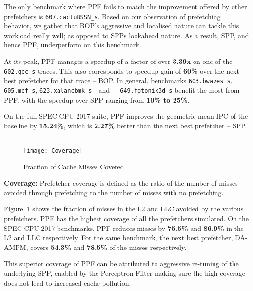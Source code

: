 The only benchmark where PPF fails to match the improvement offered by other prefetchers 
is {\tt 607.cactuBSSN\_s}. \newline Based on our observation of prefetching behavior, we gather that
BOP's aggressive and localised nature can tackle this workload really well; as opposed
to SPPs lookahead nature. As a result, SPP, and hence PPF, underperform on this benchmark. 

At its peak, PPF manages a speedup of a factor of over \textbf{3.39x} on one of the
{\tt 602.gcc\_s} traces. This also corresponds to speedup gain of
\textbf{60\%} over the next best prefetcher for that trace -- BOP. In general, benchmarks
{\tt 603.bwaves\_s}, {\tt 605.mcf\_s}, {\tt {623.xalancbmk}\_s}~~and~~{\tt
649.fotonik3d\_s}  benefit the most from PPF, with the speedup over SPP ranging
from \textbf{10\% to 25\%}.

On the full SPEC CPU 2017 suite, PPF improves the geometric mean IPC of 
the baseline by \textbf{15.24\%}, which is \textbf{2.27\%} better 
than the next best prefetcher -- SPP.\\ \\
%
\begin{figure}[ht]
\texttt{[image: Coverage]}
\caption{Fraction of Cache Misses Covered}
\label{Fig:Coverage}
\end{figure}
%
\noindent \textbf{Coverage:}
Prefetcher coverage is defined as the ratio of the number of misses avoided
through prefetching to the number of misses with no prefetching.

Figure~\ref{Fig:Coverage} shows the fraction of misses in the L2 and LLC
avoided by the various prefetchers. PPF has the highest coverage of all the
prefetchers simulated. On the SPEC CPU 2017 benchmarks, PPF reduces misses by
\textbf{75.5\%} and \textbf{86.9\%} in the L2 and LLC respectively. For the
same benchmark, the next best prefetcher, DA-AMPM, covers \textbf{54.3\%} and
\textbf{78.5\%} of the misses respectively.

This superior coverage of PPF can be attributed to aggressive re-tuning of the
underlying SPP, enabled by the Perceptron Filter making sure the high coverage
does not lead to increased cache pollution.

